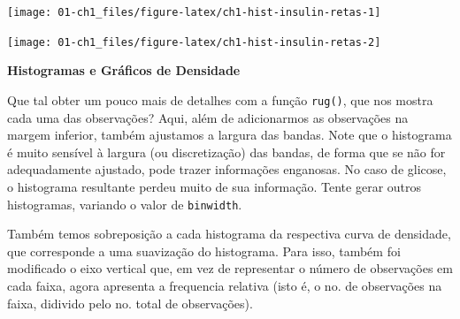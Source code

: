 \documentclass[
]{book}
\newenvironment{Shaded}{\begin{snugshade}}{\end{snugshade}}
\newcommand{\CommentTok}[1]{\textcolor[rgb]{0.56,0.35,0.01}{\textit{#1}}}
\newcommand{\DataTypeTok}[1]{\textcolor[rgb]{0.13,0.29,0.53}{#1}}
\newcommand{\KeywordTok}[1]{\textcolor[rgb]{0.13,0.29,0.53}{\textbf{#1}}}
\newcommand{\NormalTok}[1]{#1}
\newcommand{\OperatorTok}[1]{\textcolor[rgb]{0.81,0.36,0.00}{\textbf{#1}}}
\newcommand{\OtherTok}[1]{\textcolor[rgb]{0.56,0.35,0.01}{#1}}
\newcommand{\StringTok}[1]{\textcolor[rgb]{0.31,0.60,0.02}{#1}}
\theoremstyle{definition}
\theoremstyle{definition}
\theoremstyle{definition}
\theoremstyle{remark}
\begin{document}
\texttt{[image: 01-ch1\_files/figure-latex/ch1-hist-insulin-retas-1]}

\begin{Shaded}
\end{Shaded}

\texttt{[image: 01-ch1\_files/figure-latex/ch1-hist-insulin-retas-2]}

\textbf{Histogramas e Gráficos de Densidade}

Que tal obter um pouco mais de detalhes com a função \texttt{rug()}, que nos mostra cada uma das observações? Aqui, além de adicionarmos as observações na margem inferior, também ajustamos a largura das bandas. Note que o histograma é muito sensível à largura (ou discretização) das bandas, de forma que se não for adequadamente ajustado, pode trazer informações enganosas. No caso de glicose, o histograma resultante perdeu muito de sua informação. Tente gerar outros histogramas, variando o valor de \texttt{binwidth}.

Também temos sobreposição a cada histograma da respectiva curva de densidade, que corresponde a uma suavização do histograma. Para isso, também foi modificado o eixo vertical que, em vez de representar o número de observações em cada faixa, agora apresenta a frequencia relativa (isto é, o no. de observações na faixa, didivido pelo no. total de observações).
\end{document}
